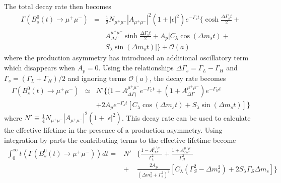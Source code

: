 The total decay rate then becomes
\begin{eqnarray}
 \Gamma\left( B^0_s(t) \rightarrow \mu^+\mu^-\right) %
             &=& \frac{1}{2}N_{\mu^{+} \mu^{-}} |A_{\mu^{+} \mu^{-}}|^2 (1+|\epsilon|^2)e^{-\Gamma_{s} t} \bigg\{ \cosh \frac{\Delta\Gamma_{s} t}{2} + \nonumber \\
& &A_{\Delta\Gamma}^{\mu^+ \mu^-} \sinh \frac{\Delta\Gamma_s t}{2} + A_p [ C_{\lambda} \cos(\Delta m_{s} t) + \nonumber \\
& & S_{\lambda} \sin(\Delta m_s t)] \bigg\} + \mathcal{O}(a)
\end{eqnarray}
where the production asymmetry has introduced an additional oscillatory term which disappears when $A_p=0$. %
Using the relationships $\Delta\Gamma_{s} = \Gamma_{L} - \Gamma_{H}$ and $\Gamma_{s} = (\Gamma_{L} + \Gamma_{H})/2$ and ignoring terms $\mathcal{O}(a)$, the decay rate becomes
\begin{eqnarray}
\label{eqn:BsmmDoubleExpoWithAp}
 \Gamma\left( B^{0}_{s}(t) \rightarrow \mu^{+} \mu^{-}\right) &\simeq& N’ \bigg\{ (1-A_{\Delta\Gamma)}^{\mu^{+} \mu^{-}}e^{-\Gamma_{L} t} + (1+A_{\Delta\Gamma}^{\mu^{+} \mu^{-}})e^{-\Gamma_{H} t} \nonumber \\
& & + 2A_p e^{-\Gamma_{s} t} \left[ C_{\lambda} \cos(\Delta m_{s} t) + S_{\lambda} \sin(\Delta m_{s} t) \right] \bigg\}
\end{eqnarray}
where $N' \equiv \frac{1}{4}N_{\mu^{+} \mu^{-}} |A_{\mu^{+} \mu^{-}}|^2 (1+|\epsilon|^2)$. 
This decay rate can be used to calculate the \bsmumu effective lifetime in the presence of a production asymmetry. Using integration by parts the contributing terms to the effective lifetime become
\begin{eqnarray}
 \int_0^\infty t \left<\Gamma\left( B^0_s(t) \rightarrow \mu^{+} \mu^{-}\right)\right> dt = &N'& \bigg\{ \frac{1-A_{\Delta\Gamma}^{\mu^{+} \mu^{-}}}{\Gamma_{L}^2} + \frac{1+A_{\Delta\Gamma}^{\mu^{+} \mu^{-}}}{\Gamma_{H}^{2}} \\
&+& \frac{2A_p}{(\Delta m_{s}^2 + \Gamma_{s}^2)^2} \left [C_{\lambda}(\Gamma_{S}^2 - \Delta m_{s}^2) + 2S_{\lambda} \Gamma_{S} \Delta m_{s} \right ] \bigg\} \nonumber
\end{eqnarray}

